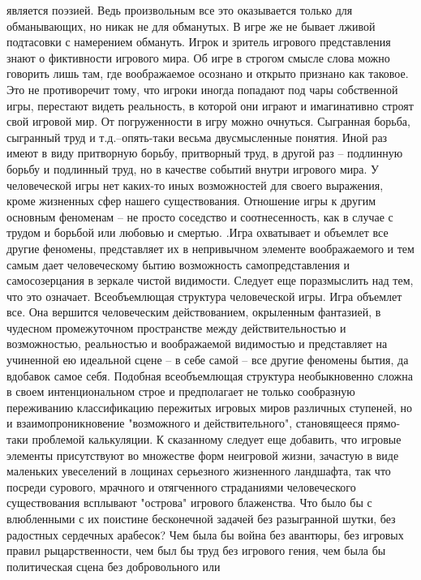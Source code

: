 \documentclass[12pt]{article}
\begin{document}
является  поэзией.  Ведь  произвольным  все  это  оказывается  только  для  обманывающих,  но  никак  не  для
обманутых.  В  игре  же  не  бывает  лживой  подтасовки  с  намерением  обмануть.  Игрок  и  зритель  игрового
представления знают о фиктивности игрового мира. Об игре в строгом смысле слова можно говорить лишь там,
где воображаемое осознано и открыто признано как таковое. Это не противоречит тому, что игроки иногда
попадают под чары собственной игры, перестают видеть реальность, в которой они играют и имагинативно
строят свой игровой мир. От погруженности в игру можно очнуться. Сыгранная борьба, сыгранный труд и т.д.--опять-таки весьма двусмысленные понятия. Иной раз имеют в виду притворную борьбу, притворный труд, в
другой  раз  --  подлинную  борьбу  и  подлинный  труд,  но  в  качестве  событий  внутри  игрового  мира.  У
человеческой игры нет каких-то иных возможностей для своего выражения, кроме жизненных сфер нашего
существования. Отношение игры к другим основным феноменам -- не просто соседство и соотнесенность, как в
случае с трудом и борьбой  или любовью  и  смертью.  .Игра  охватывает  и  объемлет все другие феномены,
представляет их в непривычном элементе воображаемого и тем самым дает человеческому бытию возможность
самопредставления и самосозерцания в зеркале чистой видимости. Следует еще поразмыслить над тем, что это
означает.
Всеобъемлющая структура человеческой игры.
Игра  объемлет  все.  Она  вершится  человеческим  действованием,  окрыленным  фантазией,  в  чудесном
промежуточном  пространстве  между  действительностью  и  возможностью,  реальностью  и  воображаемой
видимостью и представляет на учиненной ею идеальной сцене -- в себе самой -- все другие феномены бытия, да
вдобавок самое себя. Подобная всеобъемлющая структура необыкновенно сложна в своем интенциональном
строе  и  предполагает  не  только  сообразную  переживанию  классификацию  пережитых  игровых  миров
различных ступеней, но и взаимопроникновение "возможного и действительного", становящееся прямо-таки
проблемой  калькуляции.  К  сказанному  следует  еще  добавить,  что  игровые  элементы  присутствуют  во
множестве форм неигровой жизни, зачастую в виде маленьких увеселений в лощинах серьезного жизненного
ландшафта,  так  что  посреди  сурового,  мрачного  и  отягченного  страданиями  человеческого  существования
всплывают "острова" игрового блаженства. Что было бы с влюбленными с их поистине бесконечной задачей без
разыгранной шутки, без радостных сердечных арабесок? Чем была бы война без авантюры, без игровых правил
рыцарственности, чем был бы труд без игрового гения, чем была бы политическая сцена без добровольного или
\end{document}
